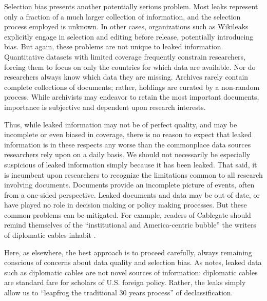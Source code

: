 \documentclass[12pt]{article}
\begin{document}
Selection bias presents another potentially serious problem. Most leaks represent only a fraction 
of a much larger collection of information, and the selection process employed is  
unknown.
In other cases, organizations such as 
Wikileaks explicitly engage in selection and editing before release, potentially introducing bias.
But again, these problems are not unique to leaked information. Quantitative datasets with limited 
coverage frequently constrain researchers, forcing them to focus on only the countries for which data 
are available. Nor do researchers always know which data they are missing. Archives rarely contain 
complete collections of documents; rather, holdings are curated by a non-random process. While 
archivists may endeavor to retain the most important documents, importance is subjective and dependent 
upon research interests.

Thus, while leaked information may not be of perfect quality, and may be incomplete or even 
biased in coverage, there is no reason to expect that leaked information is in these respects any worse 
than the commonplace data sources researchers rely upon on a daily basis. We should not necessarily 
be especially suspicious of leaked information simply because it has been leaked.
That said, it is incumbent upon researchers to recognize the limitations common to all research involving documents. 
Documents provide an incomplete picture of events, often from a one-sided perspective. 
Leaked documents and data may be out of date, or have played no role in decision making or 
policy making processes.
But these common problems can be mitigated. For example, readers of Cablegate should  
remind themselves of the ``institutional and America-centric bubble'' the writers of diplomatic cables 
inhabit \citep{kinsman2011truth}.

Here, as elsewhere, 
the best approach is to proceed carefully, always remaining conscious of concerns about data quality 
and selection bias. As \citet{western2010american} notes, leaked data such as diplomatic cables are not  
novel sources of information: diplomatic cables are standard fare for scholars of U.S. foreign policy. 
Rather, the leaks simply allow us to ``leapfrog the traditional 30 years process'' of declassification.
\end{document}
